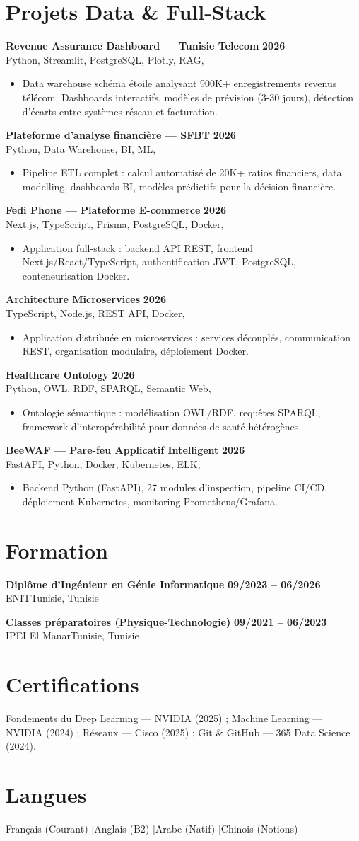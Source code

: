 \documentclass[a4paper,10pt]{article}
\newcommand{\cventry}[4]{\textbf{#1} \hfill \textbf{#4}\\[1pt]#2{\ifx\relax#3\relax\else, #3\fi}\par\vspace{1pt}}
\begin{document}
\section{Projets Data \& Full-Stack}
\cventry{Revenue Assurance Dashboard --- Tunisie Telecom}{Python, Streamlit, PostgreSQL, Plotly, RAG}{}{2026}
\begin{itemize}
  \item Data warehouse schéma étoile analysant 900K+ enregistrements revenus télécom. Dashboards interactifs, modèles de prévision (3-30 jours), détection d'écarts entre systèmes réseau et facturation.
\end{itemize}
\cventry{Plateforme d'analyse financière --- SFBT}{Python, Data Warehouse, BI, ML}{}{2026}
\begin{itemize}
  \item Pipeline ETL complet : calcul automatisé de 20K+ ratios financiers, data modelling, dashboards BI, modèles prédictifs pour la décision financière.
\end{itemize}
\cventry{Fedi Phone --- Plateforme E-commerce}{Next.js, TypeScript, Prisma, PostgreSQL, Docker}{}{2026}
\begin{itemize}
  \item Application full-stack : backend API REST, frontend Next.js/React/TypeScript, authentification JWT, PostgreSQL, conteneurisation Docker.
\end{itemize}
\cventry{Architecture Microservices}{TypeScript, Node.js, REST API, Docker}{}{2026}
\begin{itemize}
  \item Application distribuée en microservices : services découplés, communication REST, organisation modulaire, déploiement Docker.
\end{itemize}
\cventry{Healthcare Ontology}{Python, OWL, RDF, SPARQL, Semantic Web}{}{2026}
\begin{itemize}
  \item Ontologie sémantique : modélisation OWL/RDF, requêtes SPARQL, framework d'interopérabilité pour données de santé hétérogènes.
\end{itemize}
\cventry{BeeWAF --- Pare-feu Applicatif Intelligent}{FastAPI, Python, Docker, Kubernetes, ELK}{}{2026}
\begin{itemize}
  \item Backend Python (FastAPI), 27 modules d'inspection, pipeline CI/CD, déploiement Kubernetes, monitoring Prometheus/Grafana.
\end{itemize}
\section{Formation}
\cventry{Diplôme d'Ingénieur en Génie Informatique}{ENIT}{Tunisie}{09/2023 -- 06/2026}
\cventry{Classes préparatoires (Physique-Technologie)}{IPEI El Manar}{Tunisie}{09/2021 -- 06/2023}
\section{Certifications}
Fondements du Deep Learning --- NVIDIA (2025) ; Machine Learning --- NVIDIA (2024) ; Réseaux --- Cisco (2025) ; Git \& GitHub --- 365 Data Science (2024).
\section{Langues}
Français (Courant) \quad|\quad Anglais (B2) \quad|\quad Arabe (Natif) \quad|\quad Chinois (Notions)
\end{document}
